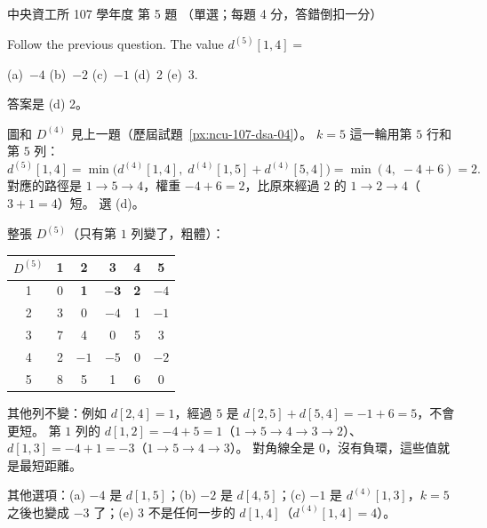 \begin{pastexam}[label={px:ncu-107-dsa-05}]{中央資工所 107 學年度 第 5 題}
（單選；每題 4 分，答錯倒扣一分）

Follow the previous question. The value $d^{(5)}[1,4]=$

(a)~$-4$ \qquad (b)~$-2$ \qquad (c)~$-1$ \qquad (d)~2 \qquad (e)~3.
\end{pastexam}

\begin{pastsoln}
答案是 (d) 2。

圖和 $D^{(4)}$ 見上一題（歷屆試題~\ref{px:ncu-107-dsa-04}）。 $k = 5$ 這一輪用第 $5$ 行和第 $5$ 列：
\[
d^{(5)}[1, 4] = \min\bigl(d^{(4)}[1, 4],\; d^{(4)}[1, 5] + d^{(4)}[5, 4]\bigr) = \min(4,\; -4 + 6) = 2 .
\]
對應的路徑是 $1 \to 5 \to 4$，權重 $-4 + 6 = 2$，比原來經過 $2$ 的 $1 \to 2 \to 4$（$3 + 1 = 4$）短。
選 (d)。

整張 $D^{(5)}$（只有第 $1$ 列變了，粗體）：
\begin{center}
\small
\begin{tabular}{c|ccccc}
$D^{(5)}$ & 1 & 2 & 3 & 4 & 5 \\ \hline
1 & 0 & \textbf{1} & $\mathbf{-3}$ & \textbf{2} & $-4$ \\
2 & 3 & 0 & $-4$ & 1 & $-1$ \\
3 & 7 & 4 & 0 & 5 & 3 \\
4 & 2 & $-1$ & $-5$ & 0 & $-2$ \\
5 & 8 & 5 & 1 & 6 & 0 \\
\end{tabular}
\end{center}
其他列不變：例如 $d[2, 4] = 1$，經過 $5$ 是 $d[2, 5] + d[5, 4] = -1 + 6 = 5$，不會更短。 第 $1$ 列的
$d[1, 2] = -4 + 5 = 1$（$1 \to 5 \to 4 \to 3 \to 2$）、$d[1, 3] = -4 + 1 = -3$（$1 \to 5 \to 4 \to 3$）。
對角線全是 $0$，沒有負環，這些值就是最短距離。

其他選項：(a) $-4$ 是 $d[1, 5]$；(b) $-2$ 是 $d[4, 5]$；(c) $-1$ 是 $d^{(4)}[1, 3]$，$k = 5$ 之後也變成
$-3$ 了；(e) $3$ 不是任何一步的 $d[1, 4]$（$d^{(4)}[1, 4] = 4$）。
\end{pastsoln}
